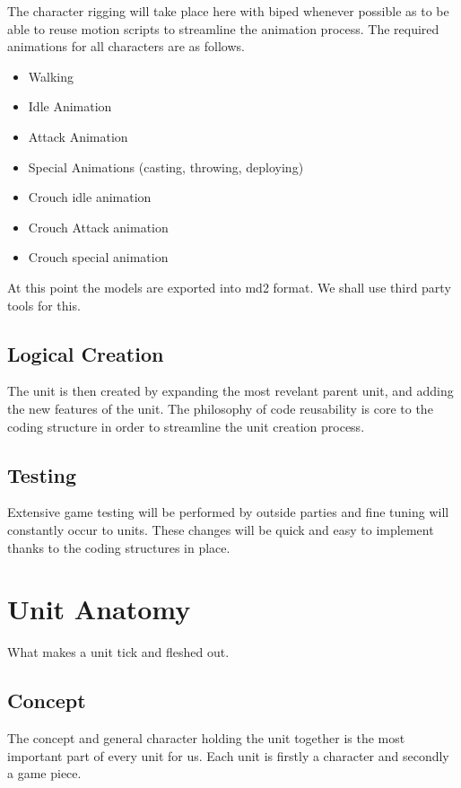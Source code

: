 \documentclass[a4paper,twocolumn]{article}
\begin{document}
The character rigging will take place here with biped whenever possible as to be able to reuse motion scripts to streamline the animation process. The required animations for all characters are as follows.

\begin{itemize}
\item Walking
\item Idle Animation
\item Attack Animation
\item Special Animations (casting, throwing, deploying)
\item Crouch idle animation
\item Crouch Attack animation
\item Crouch special animation
\end{itemize}

At this point the models are exported into md2 format. We shall use third party tools for this.

\subsection{Logical Creation}

The unit is then created by expanding the most revelant parent unit, and adding the new features of the unit. The philosophy of code reusability is core to the coding structure in order to streamline the unit creation process.

\subsection{Testing}

Extensive game testing will be performed by outside parties and fine tuning will constantly occur to units. These changes will be quick and easy to implement thanks to the coding structures in place.


\newpage \section{Unit Anatomy}

What makes a unit tick and fleshed out.

\subsection{Concept}

The concept and general character holding the unit together is the most important part of every unit for us. Each unit is firstly a character and secondly a game piece.
\end{document}
